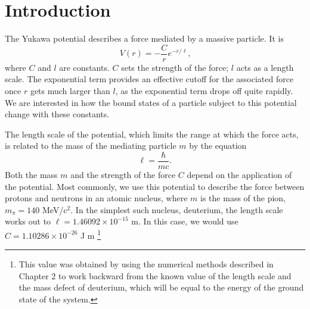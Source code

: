 \documentclass[12pt,twoside]{reedthesis}
\newcommand{\eqn}[1]{\begin{equation}#1\end{equation}}
\begin{document}
  \mainmatter %
  \pagestyle{fancyplain} %


    \chapter*{Introduction}

The Yukawa potential describes a force mediated by a massive particle. It is %
\eqn{
V(r) = -\frac{C}{r}e^{-r/\ell}\mbox{,}
}
where $C$ and $l$ are constants. $C$ sets the strength of the force; $l$ acts as a length scale. The exponential term provides an effective cutoff for the associated force once $r$ gets much larger than $l$, as the exponential term drops off quite rapidly. We are interested in how the bound states of a particle subject to this potential change with these constants. 

The length scale of the potential, which limits the range at which the force acts, is related to the mass of the mediating particle $m$ by the equation\eqn{
\ell = \frac{\hbar}{m c}\mbox{.}
}
Both the mass $m$ and the strength of the force $C$ depend on the application of the potential. Most commonly, we use this potential to describe the force between protons and neutrons in an atomic nucleus, where $m$ is the mass of the pion, $m_{\pi} = 140$ MeV/c$^2$. In the simplest such nucleus, deuterium, the length scale works out to $\ell = 1.46092 \times10^{-15}$ m. In this case, we would use $C =  1.10286 \times 10^{-26}$ J m
\footnote{This value was obtained by using the numerical methods described in Chapter 2 to work backward from the known value of the length scale and the mass defect of deuterium, which will be equal to the energy of the ground state of the system.} 
\end{document}
